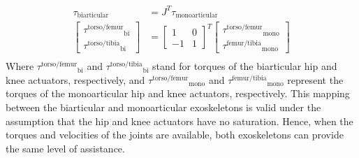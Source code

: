 \documentclass[10pt,letterpaper]{article}
\begin{document}
\begin{equation}\label{Mono_Bi_Torque_Mapping}
\begin{aligned}
\tau_{\mathrm{biarticular}} &=J^T \tau_{\mathrm{monoarticular}}\\
\left\lbrack \begin{array}{c}
{\tau^{\mathrm{torso}/\mathrm{femur}} }_{\mathrm{bi}} \\
{\tau^{\mathrm{torso}/\mathrm{tibia}} }_{\mathrm{bi}} 
\end{array}\right\rbrack &={\left\lbrack \begin{array}{cc}
	1 & 0\\
	-1 & 1
	\end{array}\right\rbrack }^T \left\lbrack \begin{array}{c}
{\tau^{\mathrm{torso}/\mathrm{femur}} }_{\mathrm{mono}} \\
{\tau^{\mathrm{femur}/\mathrm{tibia}} }_{\mathrm{mono}} 
\end{array}\right\rbrack\\
\end{aligned}
\end{equation}
Where ${\tau^{\mathrm{torso}/\mathrm{femur}} }_{\mathrm{bi}}$ and ${\tau^{\mathrm{torso}/\mathrm{tibia}} }_{\mathrm{bi}}$ stand for torques of the biarticular hip and knee actuators, respectively, and  ${\tau^{\mathrm{torso}/\mathrm{femur}} }_{\mathrm{mono}}$ and ${\tau^{\mathrm{femur}/\mathrm{tibia}} }_{\mathrm{mono}}$ represent the torques of the monoarticular hip and knee actuators, respectively.
This mapping between the biarticular and monoarticular exoskeletons is valid under the assumption that the hip and knee actuators have no saturation. Hence, when the torques and velocities of the joints are available, both exoskeletons can provide the same level of assistance. 
\end{document}
